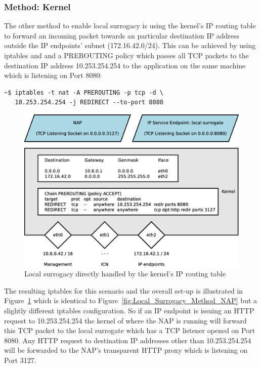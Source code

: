 \documentclass[a4paper,11pt,titlepage]{report}
\begin{document}
\subsubsection{Method: Kernel}
The other method to enable local surrogacy is using the kernel's IP routing table to forward an incoming packet towards an particular destination IP address outside the IP endpoints' subnet (172.16.42.0/24). This can be achieved by using iptables and and a PREROUTING policy which passes all TCP packets to the destination IP address 10.253.254.254 to the application on the same machine which is listening on Port 8080:

\begin{lstlisting}
~$ iptables -t nat -A PREROUTING -p tcp -d \
   10.253.254.254 -j REDIRECT --to-port 8080
\end{lstlisting}

\begin{figure}[!htb]
	\centering
	\includegraphics[width=1\linewidth]{eps/localSurrogacy-methodKernel}
	\caption{Local surrogacy directly handled by the kernel's IP routing table}
	\label{fig:Local_Surrogacy_Method_Kernel}
\end{figure}

The resulting iptables for this scenario and the overall set-up is illustrated in Figure~\ref{fig:Local_Surrogacy_Method_Kernel} which is identical to Figure~\ref{fig:Local_Surrogacy_Method_NAP} but a slightly different iptables configuration. So if an IP endpoint is issuing an \ac{HTTP} request to 10.253.254.254 the kernel of where the \ac{NAP} is running will forward this \ac{TCP} packet to the local surrogate which has a \ac{TCP} listener opened on Port 8080. Any \ac{HTTP} request to destination IP addresses other than 10.253.254.254 will be forwarded to the \ac{NAP}'s transparent \ac{HTTP} proxy which is listening on Port 3127.
\end{document}
